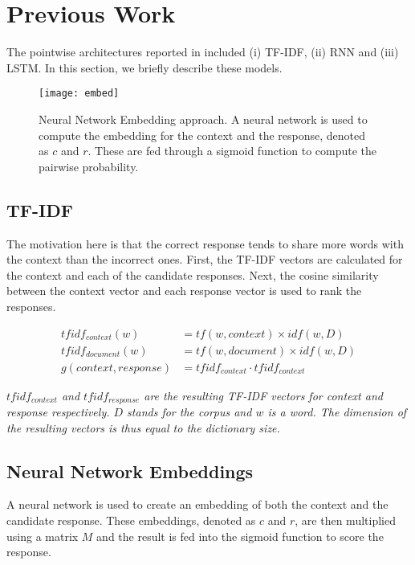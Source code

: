 \documentclass{article} \usepackage{nips15submit_e,times}
\newcommand{\MARTINSECOND}[1]{{\color{black}#1}} \newcommand{\MARTINTHIRD}[1]{{\color{black}#1}} \newcommand{\COPY}[1]{{\color{black}[#1]}}
\begin{document}
\MARTINSECOND
{
\section{Previous Work}




The pointwise architectures reported in \cite{lowe2015ubuntu} included (i) TF-IDF, (ii) RNN and (iii) LSTM.
In this section, we briefly describe these models. 

\begin{figure}[h!]
  \centering
  \texttt{[image: embed]}
  \caption   
  {
  Neural Network Embedding approach. 
  A neural network is used to compute the embedding for the context and the response, denoted as $c$ and $r$.
  These are fed through a sigmoid function to compute the pairwise probability.
  }
  \label{fig-prevwork}
\end{figure}

\subsection{TF-IDF}
The motivation here is that the correct response tends to share more words with the context than the incorrect ones.
First, the TF-IDF vectors are calculated for the context and each of the candidate responses.
Next, the cosine similarity between the context vector and each response vector is used to rank the responses.


\begin{align}
    tfidf_{context}(w) &= tf(w,context) \times idf(w,D) \\
    tfidf_{document}(w) &= tf(w,document) \times idf(w,D) \\
    g(context, response) &= tfidf_{context} \cdot tfidf_{context}
\end{align}



\begingroup\vspace*{-\baselineskip}
{
    \emph{
    $tfidf_{context}$ and $tfidf_{response}$ are the resulting TF-IDF vectors for context and response respectively.
    $D$ stands for the corpus and $w$ is a word.
    The dimension of the resulting vectors is thus equal to the dictionary size.
    }
}
\vspace*{\baselineskip}\endgroup

\subsection{Neural Network Embeddings}
A neural network is used to create an embedding of both the context and the candidate response.
These embeddings, denoted as $c$ and $r$, are then multiplied using a matrix $M$ and the result is fed into the sigmoid function
to score the response.




}
\end{document}
